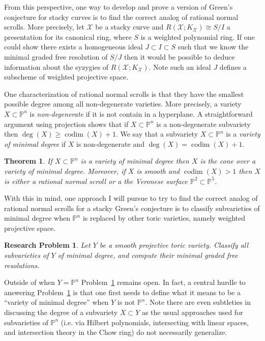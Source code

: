 \documentclass[11pt,reqno]{amsart}
\newtheorem{theorem}[lemma]{Theorem}
\newtheorem{problem}[lemma]{Research Problem}
\theoremstyle{remark}
\newcommand{\codim}{\operatorname{codim}}
\newcommand{\cX}{\mathcal{X}}
\renewcommand{\P}{\mathbb{P}}
\begin{document}
From this perspective, one way to develop and prove a version of Green's conjecture for stacky curves is to find the correct analog of rational normal scrolls. More precisely, let $\cX$ be a stacky curve and $R(\cX;K_{\cX})\cong S/I$ a presentation for its canonical ring, where $S$ is a weighted polynomial ring. If one could show there exists a homogeneous ideal $J\subset I\subset S$ such that we know the minimal graded free resolution of $S/J$ then it would be possible to deduce information about the syzygies of $R(\cX;K_{\cX})$. Note such an ideal $J$ defines a subscheme of weighted projective space. 

One characterization of rational normal scrolls is that they have the smallest possible degree among all non-degenerate varieties. More precisely, a variety $X\subset \P^{n}$ is \textit{non-degenerate} if it is not contain in a hyperplane. A straightforward argument using projection shows that if $X \subset \P^{n}$ is a non-degenerate subvariety then $\deg(X) \geq \codim(X)+1$. We say that a subvariety $X\subset \P^{n}$ is a \textit{variety of minimal degree} if $X$ is non-degenerate and $\deg(X)=\codim(X)+1$. 


\begin{theorem}\cite{eisenbudHarris87}
	If $X\subset \P^{n}$ is a variety of minimal degree then $X$ is the cone over a variety of minimal degree. Moreover, if $X$ is smooth and $\codim(X)>1$ then $X$ is either a rational normal scroll or a the Veronese surface $\P^{2}\subset \P^{5}$. 
\end{theorem}

With this in mind, one approach I will pursue to try to find the correct analog of rational normal scrolls for a stacky Green's conjecture is to classify subvarieties of minimal degree when $\P^{n}$ is replaced by other toric varieties, namely weighted projective space. 

\begin{problem}\label{prob:min-deg}
	Let $Y$ be a smooth projective toric variety. Classify all subvarieties of $Y$ of minimal degree, and compute their minimal graded free resolutions.
	\end{problem}

Outside of when $Y=\P^{n}$ Problem~\ref{prob:min-deg} remains open. In fact, a central hurdle to answering Problem~\ref{prob:min-deg} is that one first needs to define what it means to be a ``variety of minimal degree'' when $Y$ is not $\P^{n}$. Note there are even subtleties in discussing the degree of a subvariety $X\subset Y$ as the usual approaches used for subvarieties of $\P^{n}$ (i.e. via Hilbert polynomials, intersecting with linear spaces, and intersection theory in the Chow ring) do not necessarily generalize.
\end{document}
